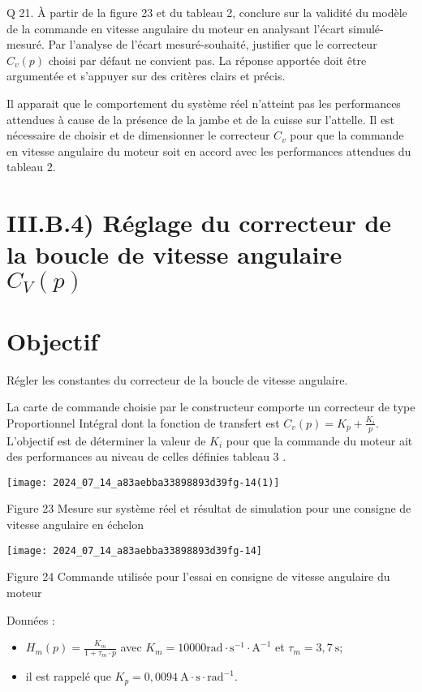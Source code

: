 Q 21. À partir de la figure 23 et du tableau 2, conclure sur la validité du modèle de la commande en vitesse angulaire du moteur en analysant l'écart simulé-mesuré. Par l'analyse de l'écart mesuré-souhaité, justifier que le correcteur $C_{v}(p)$ choisi par défaut ne convient pas. La réponse apportée doit être argumentée et s'appuyer sur des critères clairs et précis.

Il apparait que le comportement du système réel n'atteint pas les performances attendues à cause de la présence de la jambe et de la cuisse sur l'attelle. Il est nécessaire de choisir et de dimensionner le correcteur $C_{v}$ pour que la commande en vitesse angulaire du moteur soit en accord avec les performances attendues du tableau 2.

\section*{III.B.4) Réglage du correcteur de la boucle de vitesse angulaire $C_{V}(p)$}
\section*{Objectif}
Régler les constantes du correcteur de la boucle de vitesse angulaire.

La carte de commande choisie par le constructeur comporte un correcteur de type Proportionnel Intégral dont la fonction de transfert est $C_{v}(p)=K_{p}+\frac{K_{i}}{p}$. L'objectif est de déterminer la valeur de $K_{i}$ pour que la commande du moteur ait des performances au niveau de celles définies tableau 3 .

\begin{center}
\texttt{[image: 2024\_07\_14\_a83aebba33898893d39fg-14(1)]}
\end{center}

Figure 23 Mesure sur système réel et résultat de simulation pour une consigne de vitesse angulaire en échelon

\begin{center}
\texttt{[image: 2024\_07\_14\_a83aebba33898893d39fg-14]}
\end{center}

Figure 24 Commande utilisée pour l'essai en consigne de vitesse angulaire du moteur

Données :

\begin{itemize}
  \item $H_{m}(p)=\frac{K_{m}}{1+\tau_{m} \cdot p}$ avec $K_{m}=10000 \mathrm{rad} \cdot \mathrm{s}^{-1} \cdot \mathrm{A}^{-1}$ et $\tau_{m}=3,7 \mathrm{~s}$;

  \item il est rappelé que $K_{p}=0,0094 \mathrm{~A} \cdot \mathrm{s} \cdot \mathrm{rad}^{-1}$.

\end{itemize}

